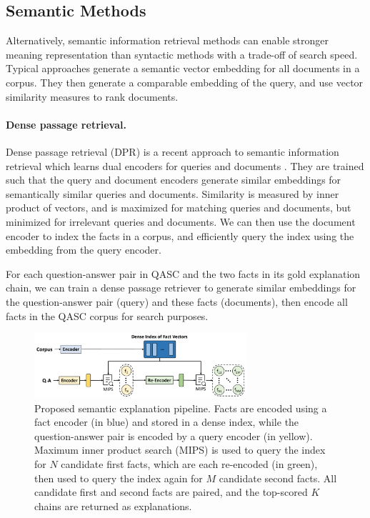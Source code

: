 \documentclass[letterpaper]{article} %
\begin{document}
\subsection{Semantic Methods}\label{sec:semantic}
Alternatively, semantic information retrieval methods can enable stronger meaning representation than syntactic methods with a trade-off of search speed. Typical approaches generate a semantic vector embedding for all documents in a corpus. They then generate a comparable embedding of the query, and use vector similarity measures to rank documents.

\paragraph{Dense passage retrieval.}
Dense passage retrieval (DPR) is a recent approach to semantic information retrieval which learns dual encoders for queries and documents \cite{karpukhin-etal-2020-dense}. They are trained such that the query and document encoders generate similar embeddings for semantically similar queries and documents. Similarity is measured by inner product of vectors, and is maximized for matching queries and documents, but minimized for irrelevant queries and documents.
We can then use the document encoder to index the facts in a corpus, and efficiently query the index using the embedding from the query encoder.

For each question-answer pair in QASC and the two facts in its gold explanation chain, we can train a dense passage retriever to generate similar embeddings for the question-answer pair (query) and these facts (documents), then encode all facts in the QASC corpus for search purposes. %

\begin{figure}
    \centering
    \includegraphics[width=0.7\textwidth]{semantic_pipeline.pdf}
    \vspace{-1em}
    \caption{Proposed semantic explanation pipeline. Facts are encoded using a fact encoder (in blue) and stored in a dense index, while the question-answer pair is encoded by a query encoder (in yellow). Maximum inner product search (MIPS) is used to query the index for $N$ candidate first facts, which are each re-encoded (in green), then used to query the index again for $M$ candidate second facts. All candidate first and second facts are paired, and the top-scored $K$ chains are returned as explanations. }
    \vspace{-1em}
    \label{fig:semantic expl pipeline}
\end{figure}
\end{document}
